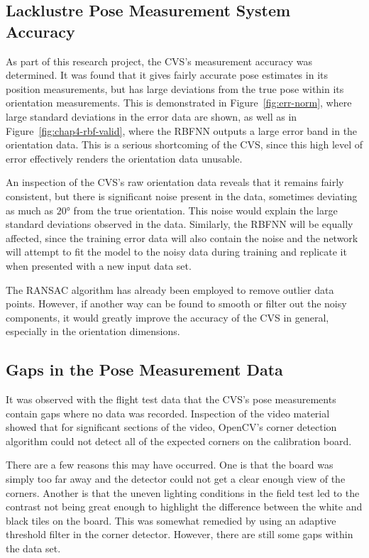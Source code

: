 \subsection{Lacklustre Pose Measurement System Accuracy}

As part of this research project, the CVS's measurement accuracy was determined. It was found that it gives fairly accurate pose estimates in its position measurements, but has large deviations from the true pose within its orientation measurements. This is demonstrated in Figure~\ref{fig:err-norm}, where large standard deviations in the error data are shown, as well as in Figure~\ref{fig:chap4-rbf-valid}, where the RBFNN outputs a large error band in the orientation data. This is a serious shortcoming of the CVS, since this high level of error effectively renders the orientation data unusable. 

An inspection of the CVS's raw orientation data reveals that it remains fairly consistent, but there is significant noise present in the data, sometimes deviating as much as $\ang{20}$ from the true orientation. This noise would explain the large standard deviations observed in the data. Similarly, the RBFNN will be equally affected, since the training error data will also contain the noise and the network will attempt to fit the model to the noisy data during training and replicate it when presented with a new input data set. 

The RANSAC algorithm has already been employed to remove outlier data points. However, if another way can be found to smooth or filter out the noisy components, it would greatly improve the accuracy of the CVS in general, especially in the orientation dimensions. 

\subsection{Gaps in the Pose Measurement Data}

It was observed with the flight test data that the CVS's pose measurements contain gaps where no data was recorded. Inspection of the video material showed that for significant sections of the video, OpenCV's corner detection algorithm could not detect all of the expected corners on the calibration board. 

There are a few reasons this may have occurred. One is that the board was simply too far away and the detector could not get a clear enough view of the corners. Another is that the uneven lighting conditions in the field test led to the contrast not being great enough to highlight the difference between the white and black tiles on the board. This was somewhat remedied by using an adaptive threshold filter in the corner detector. However, there are still some gaps within the data set. 

